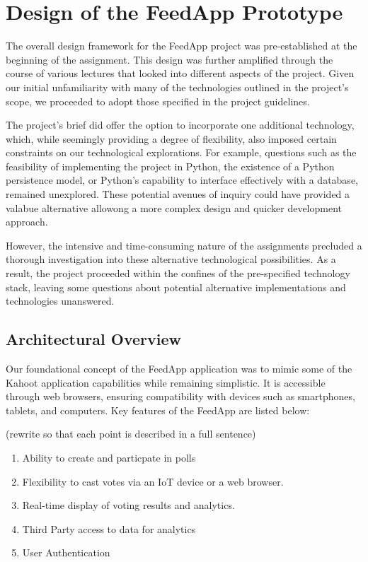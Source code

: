 \clearpage
\section{Design of the FeedApp Prototype}
\label{sec:design}

The overall design framework for the FeedApp project was pre-established at the beginning of the assignment. This design was further amplified through the course of various lectures that looked into different aspects of the project.  Given our initial unfamiliarity with many of the technologies outlined in the project's scope, we proceeded to adopt those specified in the project guidelines.

The project's brief did offer the option to incorporate one additional technology, which, while seemingly providing a degree of flexibility, also imposed certain constraints on our technological explorations. For example, questions such as the feasibility of implementing the project in Python, the existence of a Python persistence model, or Python's capability to interface effectively with a database, remained unexplored. These potential avenues of inquiry could have provided a valabue alternative allowong a more complex design and quicker development approach.

However, the intensive and time-consuming nature of the assignments precluded a thorough investigation into these alternative technological possibilities. As a result, the project proceeded within the confines of the pre-specified technology stack, leaving some questions about potential alternative implementations and technologies unanswered.

\subsection{Architectural Overview} 

 Our foundational concept of the FeedApp application was to mimic some of the Kahoot application capabilities while remaining simplistic.  It is accessible through web browsers, ensuring compatibility with devices such as smartphones, tablets, and computers.  Key features of the FeedApp are listed below:

(rewrite so that each point is described in a full sentence)
\begin{enumerate}
\item Ability to create and particpate in polls
\item Flexibility to cast votes via an IoT device or a web browser. 
\item Real-time display of voting results and analytics.
\item Third Party access to data for analytics
\item User Authentication
\end{enumerate}


